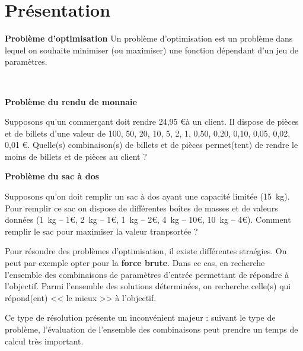 \section{Présentation}

\begin{defi} \footnotesize \textbf{\textsf{Problème d'optimisation}} \normalsize
Un problème d'optimisation est un problème dans lequel on souhaite minimiser (ou maximiser) une fonction dépendant d'un jeu de paramètres. 
\end{defi}

\begin{exemple} ~\\

\vspace{-.5cm}

\textbf{Problème du rendu de monnaie} 

Supposons qu'un commerçant doit rendre 24,95 \euro à un client. Il dispose de pièces et de billets d'une valeur de 100, 50, 20, 10, 5, 2, 1, 0,50, 0,20, 0,10, 0,05, 0,02, 0,01 \euro. Quelle(s) combinaison(s) de billets et de pièces permet(tent) de rendre le moins de billets et de pièces au client ?

\textbf{Problème du sac à dos} 

Supposons qu'on doit remplir un sac à dos ayant une capacité limitée (\SI{15}{kg}). Pour remplir ce sac on dispose de différentes boîtes de masses et de valeurs données (\SI{1}{kg} -- 1\euro, \SI{2}{kg} -- 1\euro, \SI{1}{kg} -- 2\euro,  \SI{4}{kg} -- 10\euro, \SI{10}{kg} -- 4\euro). Comment remplir le sac pour maximiser la valeur tranpsortée ?

\end{exemple}


Pour résoudre des problèmes d'optimisation, il existe différentes straégies. On peut par exemple opter pour la \textbf{force brute}. Dans ce cas, en recherche l'ensemble des combinaisons de paramètres d'entrée permettant de répondre à l'objectif. 
Parmi l'ensemble des solutions déterminées, on recherche celle(s) qui répond(ent) << le mieux >> à l'objectif.

Ce type de résolution présente un inconvénient majeur : suivant le type de problème, l'évaluation de l'ensemble des combinaisons peut prendre un temps de calcul très important. 

